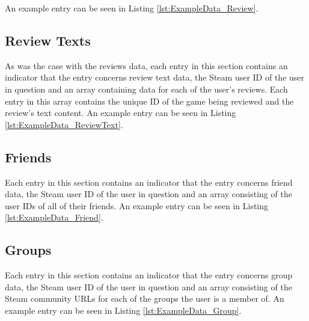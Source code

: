 An example entry can be seen in Listing \ref{lst:ExampleData_Review}.



\subsection{Review Texts}

As was the case with the reviews data, each entry in this section contains an indicator that the entry concerns review text data, the Steam user ID of the user in question and an array containing data for each of the user's reviews. Each entry in this array contains the unique ID of the game being reviewed and the review's text content. An example entry can be seen in Listing \ref{lst:ExampleData_ReviewText}.



\subsection{Friends}

Each entry in this section contains an indicator that the entry concerns friend data, the Steam user ID of the user in question and an array consisting of the user IDs of all of their friends. An example entry can be seen in Listing \ref{lst:ExampleData_Friend}.



\subsection{Groups}

Each entry in this section contains an indicator that the entry concerns group data, the Steam user ID of the user in question and an array consisting of the Steam community URLs for each of the groups the user is a member of. An example entry can be seen in Listing \ref{lst:ExampleData_Group}.



